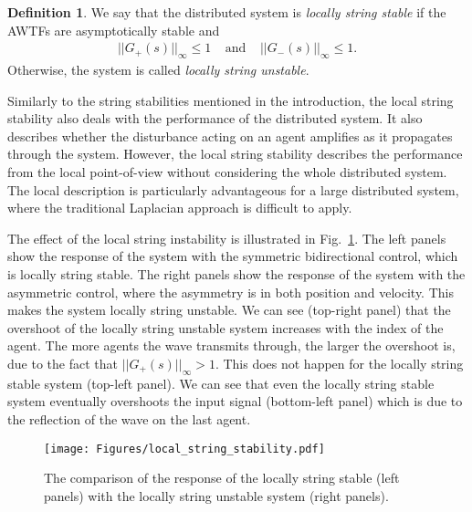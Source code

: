 \documentclass[10pt,twocolumn,twoside]{IEEEtran}
\theoremstyle{definition}
\newtheorem{defn}{Definition}
\begin{document}
\begin{defn}
  We say that the distributed system is \emph{locally string stable} if the AWTFs are asymptotically stable and
  \begin{align}
    ||G_+(s)||_{\infty} \leq 1 \;\;\;\; \text{and} \;\;\;\; ||G_-(s)||_{\infty} \leq 1.
  \end{align}
  Otherwise, the system is called \emph{locally string unstable}.
\end{defn}

Similarly to the string stabilities mentioned in the introduction, the local string stability also deals with the performance of the distributed system. It also describes whether the disturbance acting on an agent amplifies as it propagates through the system. However, the local string stability describes the performance from the local point-of-view without considering the whole distributed system. The local description is particularly advantageous for a large distributed system, where the traditional Laplacian approach is difficult to apply.



The effect of the local string instability is illustrated in Fig.~\ref{fig:local_string_stability}. The left panels show the response of the system with the symmetric bidirectional control, which is locally string stable. The right panels show the response of the system with the asymmetric control, where the asymmetry is in both position and velocity. This makes the system locally string unstable. We can see (top-right panel) that the overshoot of the locally string unstable system increases with the index of the agent. The more agents the wave transmits through, the larger the overshoot is, due to the fact that $||G_{+}(s)||_{\infty} > 1$. This does not happen for the locally string stable system (top-left panel). We can see that even the locally string stable system eventually overshoots the input signal (bottom-left panel) which is due to the reflection of the wave on the last agent.






\begin{figure}[ht]
 \centering
  \texttt{[image: Figures/local\_string\_stability.pdf]}
  \caption{The comparison of the response of the locally string stable (left panels) with the locally string unstable system (right panels).}
  \label{fig:local_string_stability}
\end{figure}
\end{document}
